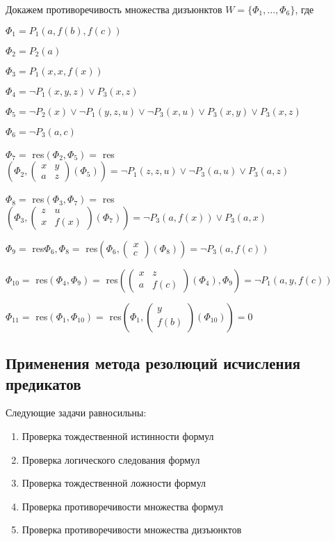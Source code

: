 \begin{example}
    Докажем противоречивость множества дизъюнктов $W=\{\Phi_1,\ldots,\Phi_6\}$, где 

    $\Phi_1 = P_1(a,f(b),f(c))$

    $\Phi_2=P_2(a)$

    $\Phi_3 = P_1(x,x,f(x))$

    $\Phi_4 = \lnot P_1(x,y,z)\lor P_3(x,z)$

    $\Phi_5 = \lnot P_2(x)\lor \lnot P_1(y,z,u)\lor\lnot P_3(x,u)\lor P_3(x,y)\lor P_3(x,z)$

    $\Phi_6 = \lnot P_3(a,c)$

    $\Phi_7 =$ res$(\Phi_2,\Phi_5) =$ res $(\Phi_2,\begin{pmatrix}
        x & y \\ a & z \end{pmatrix} (\Phi_5)) = \lnot P_1(z,z,u)\lor\lnot P_3(a,u)\lor P_3(a,z)$
    
    $\Phi_8 = $ res$(\Phi_3,\Phi_7) =$ res$(\Phi_3,\begin{pmatrix}
        z & u \\ x & f(x)
    \end{pmatrix}(\Phi_7)) = \lnot P_3(a,f(x))\lor P_3(a,x)$

    $\Phi_9 = $ res$\Phi_6,\Phi_8 = $ res$(\Phi_6, \begin{pmatrix}
        x \\ c
    \end{pmatrix}(\Phi_8)) = \lnot P_3(a,f(c))$

    $\Phi_{10} =$ res$(\Phi_4,\Phi_9) =$ res$(\begin{pmatrix}
        x & z \\ a & f(c)
    \end{pmatrix}(\Phi_4),\Phi_9) = \lnot P_1(a,y,f(c))$

    $\Phi_{11} =$ res$(\Phi_1,\Phi_{10}) =$ res$(\Phi_1,\begin{pmatrix}
        y \\ f(b)
    \end{pmatrix}(\Phi_{10})) = 0$
\end{example}

\subsection*{Применения метода резолюций исчисления предикатов}
Следующие задачи равносильны:
\begin{enumerate}
    \item Проверка тождественной истинности формул
    \item Проверка логического следования формул
    \item Проверка тождественной ложности формул
    \item Проверка противоречивости множества формул
    \item Проверка противоречивости множества дизъюнктов
\end{enumerate}

